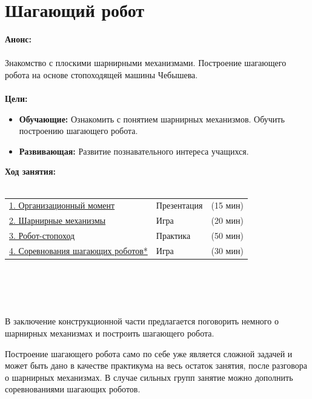 \chapter{Шагающий робот}
{\bfseries Анонс:}\\\\
Знакомство с плоскими шарнирными механизмами. Построение шагающего робота на основе стопоходящей машины Чебышева.\\\\
{\bfseries Цели:}
\begin{itemize}
	\item{}{\bfseries Обучающие:} Ознакомить с понятием шарнирных механизмов. Обучить построению шагающего робота. 
	\item{}{\bfseries Развивающая:} Развитие познавательного интереса учащихся.\\
\end{itemize}	
{\bfseries Ход занятия:}\\\\
\begin{tabular}[h!]{lll}
	{\hyperlink{lesson22x1}{1. Организационный момент}}&{Презентация}&{(15 мин)}\\
	{\hyperlink{lesson22x2}{2. Шарнирные механизмы}}&{Игра}&{(20 мин)}\\
	{\hyperlink{lesson22x3}{3. Робот-стопоход}}&{Практика}&{(50 мин)}\\
	{\hyperlink{lesson22x4}{4. Соревнования  шагающих роботов*}}&{Игра}&{(30 мин)}\\
\end{tabular}\\\\

{\hypertarget{lesson22x1}{}}\\\\	

В заключение конструкционной части предлагается поговорить немного о шарнирных механизмах и построить шагающего робота. 

Построение шагающего робота само по себе уже является сложной задачей и может быть дано в качестве практикума на весь остаток занятия, после разговора о шарнирных механизмах. В случае сильных групп занятие можно дополнить соревнованиями шагающих роботов.\\\\
\clearpage
{\hypertarget{lesson22x2}{}}\\\\

